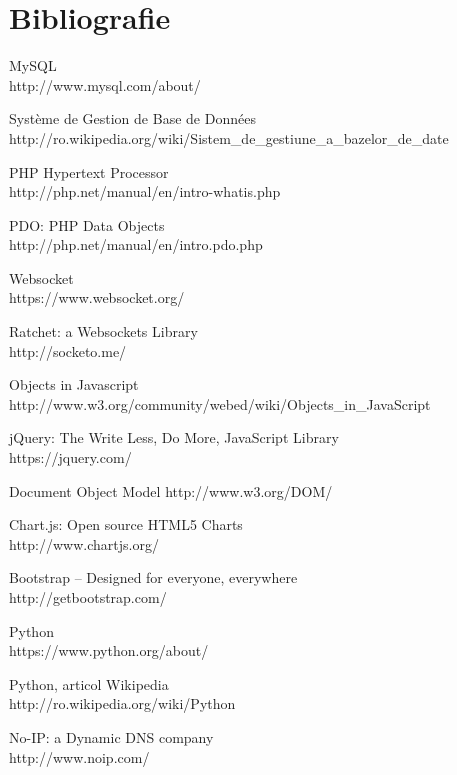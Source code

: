 \documentclass[12pt,a4paper]{article}
\begin{document}
\newpage
\section{Bibliografie}
\begingroup
\renewcommand{\section}[2]{}%
\begin{thebibliography}{99}

	MySQL \\
	http://www.mysql.com/about/
	
	Système de Gestion de Base de Données\\
	http://ro.wikipedia.org/wiki/Sistem\_de\_gestiune\_a\_bazelor\_de\_date

	PHP Hypertext Processor\\
	http://php.net/manual/en/intro-whatis.php

	PDO: PHP Data Objects\\
	http://php.net/manual/en/intro.pdo.php
	
	Websocket\\
	https://www.websocket.org/
	
	Ratchet: a Websockets Library\\
	http://socketo.me/
	
	Objects in Javascript\\
	http://www.w3.org/community/webed/wiki/Objects\_in\_JavaScript
	
	jQuery: The Write Less, Do More, JavaScript Library\\
	https://jquery.com/
	
	Document Object Model
	http://www.w3.org/DOM/

	Chart.js: Open source HTML5 Charts \\
	http://www.chartjs.org/
	
	Bootstrap -- Designed for everyone, everywhere \\
	http://getbootstrap.com/
	
	Python \\
	https://www.python.org/about/

	Python, articol Wikipedia\\
	http://ro.wikipedia.org/wiki/Python
	
	No-IP: a Dynamic DNS company \\
	http://www.noip.com/
	

\end{thebibliography}
\end{document}
